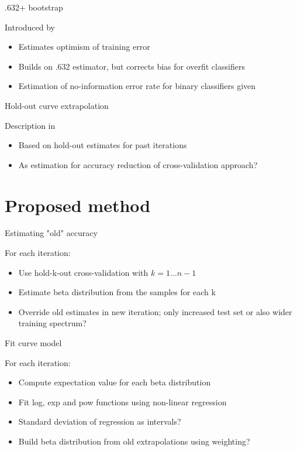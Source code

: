 \documentclass{beamer}
\begin{document}
\begin{frame}{.632+ bootstrap}
	\begin{description}
		\item[Introduced by \cite{EfronEtAl1997}]
	\end{description}
	\begin{itemize}
		\item Estimates optimism of training error
		\item Builds on .632 estimator, but corrects bias for overfit classifiers
		\item Estimation of no-information error rate for binary classifiers given
	\end{itemize}
\end{frame}

\begin{frame}{Hold-out curve extrapolation}
	\begin{description}
		\item[Description in \cite{FigueroaEtal2012}]
	\end{description}
	\begin{itemize}
		\item Based on hold-out estimates for past iterations
		\item As estimation for accuracy reduction of cross-validation approach?
	\end{itemize}
\end{frame}

\section{Proposed method}
\begin{frame}{Estimating "old" accuracy}
	\begin{description}
		\item[For each iteration:]
	\end{description}
	\begin{itemize}
		\item Use hold-k-out cross-validation with $k=1...n-1$
		\item Estimate beta distribution from the samples for each k
		\item Override old estimates in new iteration; only increased test set or also wider training spectrum?
	\end{itemize}
\end{frame}
\begin{frame}{Fit curve model}
	\begin{description}
		\item[For each iteration:]
	\end{description}
	\begin{itemize}
		\item Compute expectation value for each beta distribution
		\item Fit log, exp and pow functions using non-linear regression
		\item Standard deviation of regression as intervals?
		\item Build beta distribution from old extrapolations using weighting?
	\end{itemize}
\end{frame}
\end{document}
